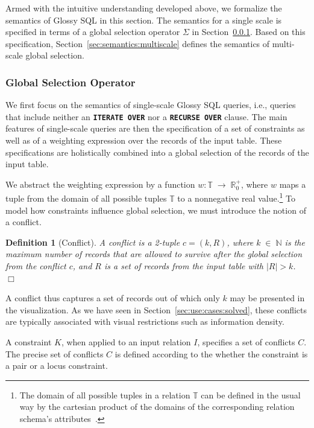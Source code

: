 \documentclass[11pt, oneside]{report}
\newtheorem{definition}{Definition}
\newcommand{\mathendbox}{\hfill$\Box$}
\begin{document}
{Armed with the intuitive understanding developed above, we formalize the semantics of Glossy SQL in this section. The semantics for a single scale is specified in terms of a global selection operator $\Sigma$ in Section~\ref{sec:semantics:global:selection}. Based on this specification, Section~\ref{sec:semantics:multiscale} defines the semantics of multi-scale global selection.

\subsubsection{Global Selection Operator}
\label{sec:semantics:global:selection}

We first focus on the semantics of single-scale Glossy SQL queries, i.e., queries that include neither an \textbf{\texttt{ITERATE OVER}} nor a \textbf{\texttt{RECURSE OVER}} clause. The main features of single-scale queries are then the specification of a set of constraints as well as of a weighting expression over the records of the input table. These specifications are holistically combined into a global selection of the records of the input table.

We abstract the weighting expression by a function $w: \mathbb{T} \; \rightarrow \; \mathbb{R}_{0}^+$, where $w$ maps a tuple from the domain of all possible tuples $\mathbb{T}$ to a nonnegative real value.\footnote{The domain of all possible tuples in a relation $\mathbb{T}$ can be defined in the usual way by the cartesian product of the domains of the corresponding relation schema's attributes~\cite{ramakrishnan2003cowbook}.} To model how constraints influence global selection, we must introduce the notion of a conflict. 

\begin{definition}[Conflict]
A conflict is a 2-tuple $c = (k, R)$, where $k \; \in \; \mathbb{N}$ is the maximum number of records that are allowed to survive after the global selection from the conflict $c$, and $R$ is a set of records from the input table with $|R| > k$. \mathendbox
\end{definition}
 
A conflict thus captures a set of records out of which only $k$ may be presented in the visualization. As we have seen in Section~\ref{sec:use:cases:solved}, these conflicts are typically associated with visual restrictions such as information density. 
 
A constraint $K$, when applied to an input relation $I$, specifies a set of conflicts $C$. The precise set of conflicts $C$ is defined according to the whether the constraint is a pair or a locus constraint. 

}
\end{document}
